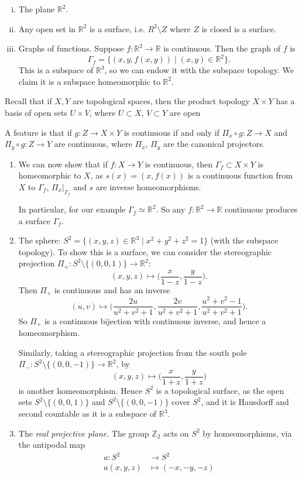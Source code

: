 \documentclass[12pt]{article}
\begin{document}
\begin{exbox}
	\begin{enumerate}[(i)]
		\item The plane $\mathbb{R}^2$.
		\item Any open set in $\mathbb{R}^2$ is a surface, i.e. $R^2 \setminus Z$ where $Z$ is closed is a surface.
		\item Graphs of functions. Suppose $f : \mathbb{R}^2 \to \mathbb{R}$ is continuous. Then the graph of $f$ is
			\[
				\Gamma_f = \{(x, y, f(x, y)) \mid (x, y) \in \mathbb{R}^2\}
			.\]
			This is a subspace of $\mathbb{R}^3$, so we can endow it with the subspace topology. We claim it is a subspace homeomorphic to $\mathbb{R}^2$.
	\end{enumerate}
	Recall that if $X, Y$ are topological spaces, then the product topology $X \times Y$ has a basis of open sets $U \times V$, where $U \subset X$, $V \subset Y$ are open

	A feature is that if $g : Z \to X \times Y$ is continuous if and only if $\Pi_x \circ g : Z \to X$ and $\Pi_y \circ g : Z \to Y$ are continuous, where $\Pi_x$, $\Pi_y$ are the canonical projectors.
	\begin{enumerate}[resume*]
		\item[]We can now show that if $f : X \to Y$ is continuous, then $\Gamma_f \subset X \times Y$ is homeomorphic to $X$, as $s(x) = (x,f(x))$ is a continuous function from $X$ to $\Gamma_f$, $\Pi_x|_{\Gamma_f}$ and $s$ are inverse homeomorphisms.

		In particular, for our example $\Gamma_f \simeq \mathbb{R}^2$. So any $f : \mathbb{R}^2 \to \mathbb{R}$ continuous produces a surface $\Gamma_f$.
	\item The sphere: $S^2 = \{(x, y, z) \in \mathbb{R}^3 \mid x^2 + y^2 + z^2 = 1\}$ (with the subspace topology). To show this is a surface, we can consider the stereographic projection $\Pi_{+}: S^2 \setminus\{(0,0,1)\} \to \mathbb{R}^2$:
			\[
				(x, y, z) \mapsto \biggl( \frac{x}{1-z}, \frac{y}{1-z} \biggr)
			.\]
	Then $\Pi_{+}$ is continuous and has an inverse
	\[
		(u, v) \mapsto \biggl( \frac{2u}{u^2 + v^2 + 1}, \frac{2v}{u^2 + v^2 + 1}, \frac{u^2 + v^2 - 1}{u^2 + v^2 + 1} \biggr)
	.\]
	So $\Pi_{+}$ is a continuous bijection with continuous inverse, and hence a homeomorphism.

	Similarly, taking a stereographic projection from the south pole $\Pi_{-} : S^2 \setminus \{(0, 0, -1)\} \to \mathbb{R}^2$, by
	\[
		(x, y, z) \mapsto \biggl( \frac{x}{1+z}, \frac{y}{1+z} \biggr)
	\]
	is another homeomorphism. Hence $S^2$ is a topological surface, as the open sets $S^2 \setminus \{(0, 0, 1)\}$ and $S^2 \setminus \{(0, 0, -1)\}$ cover $S^2$, and it is Hausdorff and second countable as it is a subspace of $\mathbb{R}^3$.
\item The \emph{real projective plane}. The group $\mathbb{Z}_2$ acts on $S^{2}$ by homeomorphisms, via the antipodal map
	\begin{align*}
		a : S^2 &\to S^2 \\
		a(x, y, z) &\mapsto (-x, -y, -z)
	\end{align*}
	\end{enumerate}
\end{exbox}
\end{document}
